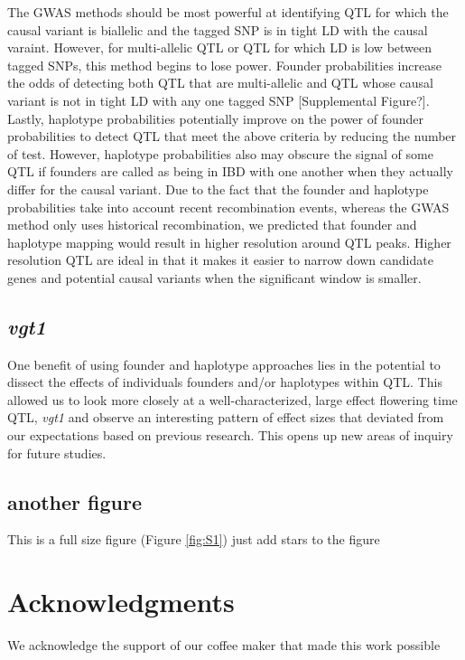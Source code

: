 \documentclass[article,9pt,twocolumn,twoside]{rilabRxiv}
\begin{document}
The GWAS methods should be most powerful at identifying QTL for which the causal variant is biallelic and the tagged SNP is in tight LD with the causal varaint. However, for multi-allelic QTL or QTL for which LD is low between tagged SNPs, this method begins to lose power. Founder probabilities increase the odds of detecting both QTL that are multi-allelic and QTL whose causal variant is not in tight LD with any one tagged SNP [Supplemental Figure?]. Lastly, haplotype probabilities potentially improve on the power of founder probabilities to detect QTL that meet the above criteria by reducing the number of test. However, haplotype probabilities also may obscure the signal of some QTL if founders are called as being in IBD with one another when they actually differ for the causal variant. Due to the fact that the founder and haplotype probabilities take into account recent recombination events, whereas the GWAS method only uses historical recombination, we predicted that founder and haplotype mapping would result in higher resolution around QTL peaks. Higher resolution QTL are ideal in that it makes it easier to narrow down candidate genes and potential causal variants when the significant window is smaller.

\subsection{\emph{vgt1}}
One benefit of using founder and haplotype approaches lies in the potential to dissect the effects of individuals founders and/or haplotypes within QTL. This allowed us to look more closely at a well-characterized, large effect flowering time QTL, \emph{vgt1} and observe an interesting pattern of effect sizes that deviated from our expectations based on previous research. This opens up new areas of inquiry for future studies.


\subsection{another figure}
This is a full size figure (Figure \ref{fig:S1}) just add stars to the figure


\section{Acknowledgments}
We acknowledge the support of our coffee maker that made this work possible


\end{document}
